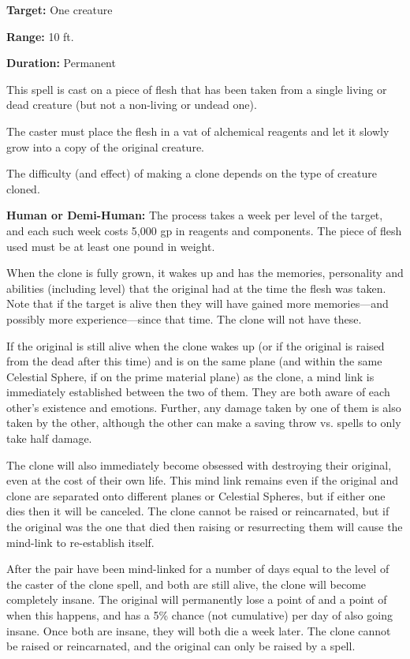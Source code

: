 \begin{multicols*}{2}
{\textbf{Target:} One creature

\textbf{Range:} 10 ft.

\textbf{Duration:} Permanent}

This spell is cast on a piece of flesh that has been taken from a single living or dead creature (but not a non-living or undead one).

The caster must place the flesh in a vat of alchemical reagents and let it slowly grow into a copy of the original creature.

The difficulty (and effect) of making a clone depends on the type of creature cloned.

\textbf{Human or Demi-Human:} The process takes a week per level of the target, and each such week costs 5,000 gp in reagents and components. The piece of flesh used must be at least one pound in weight.

When the clone is fully grown, it wakes up and has the memories, personality and abilities (including level) that the original had at the time the flesh was taken. Note that if the target is alive then they will have gained more memories—and possibly more experience—since that time. The clone will not have these.

If the original is still alive when the clone wakes up (or if the original is raised from the dead after this time) and is on the same plane (and within the same Celestial Sphere, if on the prime material plane) as the clone, a mind link is immediately established between the two of them. They are both aware of each other’s existence and emotions. Further, any damage taken by one of them is also taken by the other, although the other can make a saving throw vs. spells to only take half damage.

The clone will also immediately become obsessed with destroying their original, even at the cost of their own life. This mind link remains even if the original and clone are separated onto different planes or Celestial Spheres, but if either one dies then it will be canceled. The clone cannot be raised or reincarnated, but if the original was the one that died then raising or resurrecting them will cause the mind-link to re-establish itself.

After the pair have been mind-linked for a number of days equal to the level of the caster of the clone spell, and both are still alive, the clone will become completely insane. The original will permanently lose a point of  and a point of  when this happens, and has a 5\% chance (not cumulative) per day of also going insane. Once both are insane, they will both die a week later. The clone cannot be raised or reincarnated, and the original can only be raised by a  spell.


\end{multicols*}
